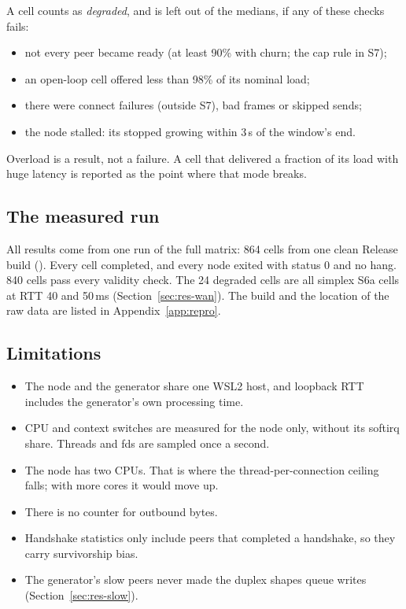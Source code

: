 A cell counts as \emph{degraded}, and is left out of the medians, if any of these
checks fails:
\begin{itemize}
  \item not every peer became ready (at least 90\% with churn; the cap rule in S7);
  \item an open-loop cell offered less than 98\% of its nominal load;
  \item there were connect failures (outside S7), bad frames or skipped sends;
  \item the node stalled: its  stopped growing within 3\,s of the
        window's end.
\end{itemize}
Overload is a result, not a failure. A cell that delivered a fraction of its load with
huge latency is reported as the point where that mode breaks.

\subsection{The measured run}

All results come from one run of the full matrix: 864 cells from one clean Release
build (). Every cell completed, and every node exited with status 0 and no
hang. 840 cells pass every validity check. The 24 degraded cells are all simplex S6a
cells at RTT 40 and 50\,ms (Section~\ref{sec:res-wan}). The build and the location of
the raw data are listed in Appendix~\ref{app:repro}.

\subsection{Limitations}

\begin{itemize}
  \item The node and the generator share one WSL2 host, and loopback RTT includes the
        generator's own processing time.
  \item CPU and context switches are measured for the node only, without its softirq
        share. Threads and fds are sampled once a second.
  \item The node has two CPUs. That is where the thread-per-connection ceiling falls;
        with more cores it would move up.
  \item There is no counter for outbound bytes.
  \item Handshake statistics only include peers that completed a handshake, so they
        carry survivorship bias.
  \item The generator's slow peers never made the duplex shapes queue writes
        (Section~\ref{sec:res-slow}).
\end{itemize}
